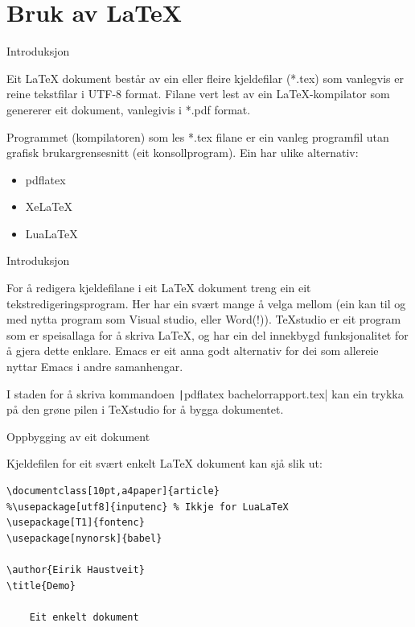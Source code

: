 \section{Bruk av \LaTeX}

\begin{frame}{Introduksjon}
	
	Eit \LaTeX{} dokument består av ein eller fleire kjeldefilar (*.tex) som vanlegvis er reine tekstfilar i UTF-8 format. Filane vert lest av ein \LaTeX{}-kompilator som genererer eit dokument, vanlegivis i *.pdf format.
	
	Programmet (kompilatoren) som les *.tex filane er ein vanleg programfil utan grafisk brukargrensesnitt (eit konsollprogram). Ein har ulike alternativ:
	
	\begin{itemize}
		\item pdflatex
		\item XeLaTeX
		\item LuaLaTeX
	\end{itemize}
	
\end{frame}


\begin{frame}{Introduksjon}

  	
	
	For å redigera kjeldefilane i eit \LaTeX{} dokument treng ein eit tekstredigeringsprogram. Her har ein svært mange å velga mellom (ein kan til og med nytta program som Visual studio, eller Word(!)). TeXstudio er eit program som er speisallaga for å skriva \LaTeX{}, og har ein del innekbygd funksjonalitet for å gjera dette enklare. Emacs er eit anna godt alternativ for dei som allereie nyttar Emacs i andre samanhengar.
	
	I staden for å skriva kommandoen \texttt|pdflatex bachelorrapport.tex| kan ein trykka på den grøne pilen i TeXstudio for å bygga dokumentet.
	
\end{frame}

\begin{frame}[containsverbatim]{Oppbygging av eit dokument}
	
Kjeldefilen for eit svært enkelt \LaTeX{} dokument kan sjå slik ut:

	\begin{verbatim}
\documentclass[10pt,a4paper]{article}
%\usepackage[utf8]{inputenc} % Ikkje for LuaLaTeX
\usepackage[T1]{fontenc}
\usepackage[nynorsk]{babel}

\author{Eirik Haustveit}
\title{Demo}

	Eit enkelt dokument

	\end{verbatim}
	
\end{frame}


